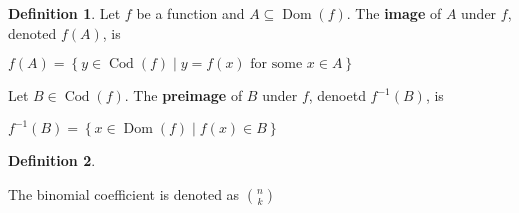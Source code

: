 \documentclass{article}
\theoremstyle{definition}
\newtheorem{definition}{Definition}[section]
\DeclareMathOperator*{\Dom}{Dom}
\DeclareMathOperator*{\Cod}{Cod}
\begin{document}
\begin{definition}
    Let $f$ be a function and $A \subseteq \Dom(f)$.
    The \textbf{image} of $A$ under $f$, denoted $f(A)$,
    is
    \begin{center}
        $f(A) = \left\{ y \in \Cod(f) \mid y = f(x) 
        \text{ for some } x \in A \right\}$
    \end{center}
    Let $B \in \Cod(f)$. The \textbf{preimage} of $B$ under
    $f$, denoetd $f^{-1}(B)$, is 
    \begin{center}
        $f^{-1}(B) = \left\{ x \in \Dom(f) \mid 
        f(x) \in B \right\}$
    \end{center}
\end{definition}
\begin{definition}
    \begin{center}
        The binomial coefficient
        is denoted as $\binom{n}{k}$
    \end{center}
\end{definition}
\end{document}
